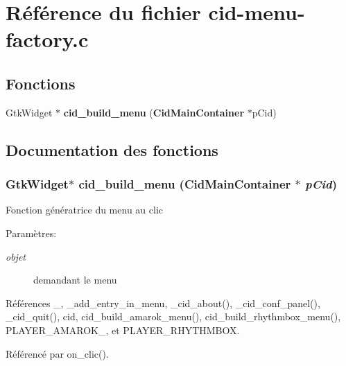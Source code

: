 \section{Référence du fichier cid-menu-factory.c}
\label{cid-menu-factory_8c}
\subsection*{Fonctions}
\begin{CompactItemize}
\item 
GtkWidget $\ast$ {\bf cid\_\-build\_\-menu} ({\bf CidMainContainer} $\ast$pCid)
\end{CompactItemize}


\subsection{Documentation des fonctions}
\subsubsection{\setlength{\rightskip}{0pt plus 5cm}GtkWidget$\ast$ cid\_\-build\_\-menu ({\bf CidMainContainer} $\ast$ {\em pCid})}\label{cid-menu-factory_8c_cab76f9da7f63cdda8f0a32002099be5}


Fonction génératrice du menu au clic \begin{Desc}
\item[Paramètres:]
\begin{description}
\item[{\em objet}]demandant le menu \end{description}
\end{Desc}


Références \_\-, \_\-add\_\-entry\_\-in\_\-menu, \_\-cid\_\-about(), \_\-cid\_\-conf\_\-panel(), \_\-cid\_\-quit(), cid, cid\_\-build\_\-amarok\_\-menu(), cid\_\-build\_\-rhythmbox\_\-menu(), PLAYER\_\-AMAROK\_, et PLAYER\_\-RHYTHMBOX.

Référencé par on\_\-clic().